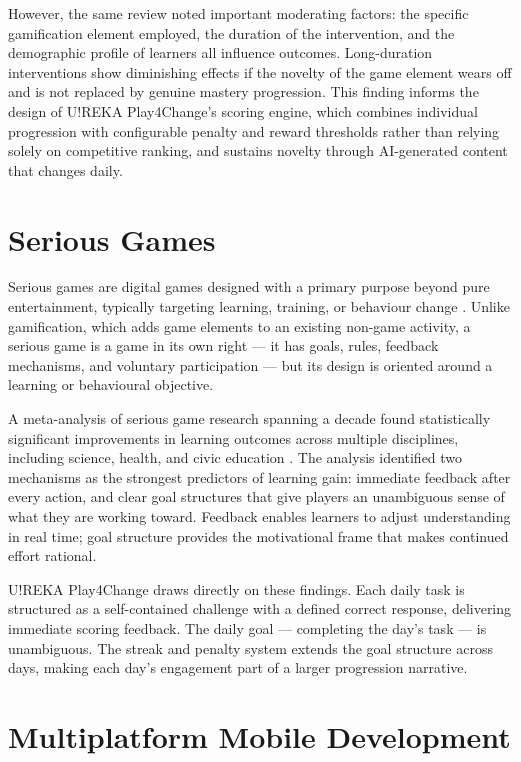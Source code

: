 However, the same review noted important moderating factors: the specific gamification element employed, the duration of the intervention, and the demographic profile of learners all influence outcomes. Long-duration interventions show diminishing effects if the novelty of the game element wears off and is not replaced by genuine mastery progression. This finding informs the design of U!REKA Play4Change's scoring engine, which combines individual progression with configurable penalty and reward thresholds rather than relying solely on competitive ranking, and sustains novelty through AI-generated content that changes daily.

\section{Serious Games}
\label{sec:seriousgames}

Serious games are digital games designed with a primary purpose beyond pure entertainment, typically targeting learning, training, or behaviour change \cite{zhonggen2019meta}. Unlike gamification, which adds game elements to an existing non-game activity, a serious game is a game in its own right --- it has goals, rules, feedback mechanisms, and voluntary participation --- but its design is oriented around a learning or behavioural objective.

A meta-analysis of serious game research spanning a decade found statistically significant improvements in learning outcomes across multiple disciplines, including science, health, and civic education \cite{zhonggen2019meta}. The analysis identified two mechanisms as the strongest predictors of learning gain: immediate feedback after every action, and clear goal structures that give players an unambiguous sense of what they are working toward. Feedback enables learners to adjust understanding in real time; goal structure provides the motivational frame that makes continued effort rational.

U!REKA Play4Change draws directly on these findings. Each daily task is structured as a self-contained challenge with a defined correct response, delivering immediate scoring feedback. The daily goal --- completing the day's task --- is unambiguous. The streak and penalty system extends the goal structure across days, making each day's engagement part of a larger progression narrative.

\section{Multiplatform Mobile Development}
\label{sec:multiplatform}

